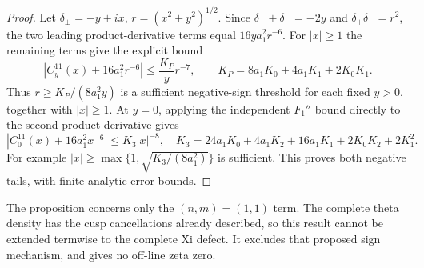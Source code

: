 \documentclass[11pt]{article}
\theoremstyle{remark}\newtheorem{remark}[theorem]{Remark}
\begin{document}
\begin{proof}
Let $\delta_\pm=-y\pm ix$, $r=(x^2+y^2)^{1/2}$.
Since $\delta_++\delta_-=-2y$ and $\delta_+\delta_-=r^2$,
the two leading product-derivative terms equal $16ya_1^2r^{-6}$.
For $|x|\ge1$ the remaining terms give the explicit bound
\[
 \left|C_y^{11}(x)+16a_1^2r^{-6}\right|
 \le \frac{K_P}{y}r^{-7},\qquad
 K_P=8a_1K_0+4a_1K_1+2K_0K_1.
\]
Thus $r\ge K_P/(8a_1^2y)$ is a sufficient negative-sign threshold
for each fixed $y>0$, together with $|x|\ge1$.
At $y=0$, applying the independent $F_1''$ bound directly to
the second product derivative gives
\[
 |C_0^{11}(x)+16a_1^2x^{-6}|\le K_3|x|^{-8},
 \quad
 K_3=24a_1K_0+4a_1K_2+16a_1K_1+2K_0K_2+2K_1^2.
\]
For example $|x|\ge\max\{1,\sqrt{K_3/(8a_1^2)}\}$ is sufficient.
This proves both negative tails, with finite analytic error bounds.
\end{proof}

The proposition concerns only the $(n,m)=(1,1)$ term.
The complete theta density has the cusp cancellations already
described, so this result cannot be extended termwise to the complete
Xi defect. It excludes that proposed sign mechanism, and gives
no off-line zeta zero.
\end{document}
